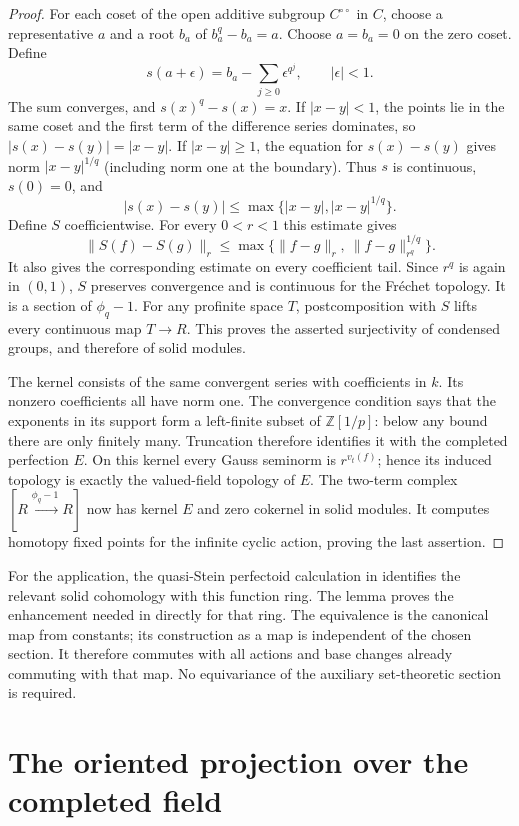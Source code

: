 \documentclass[11pt]{article}
\numberwithin{equation}{section}
\theoremstyle{definition}
\theoremstyle{remark}
\begin{document}
\begin{proof}
For each coset of the open additive subgroup $C^{\circ\circ}$ in $C$,
choose a representative $a$ and a root $b_a$ of $b_a^q-b_a=a$.
Choose $a=b_a=0$ on the zero coset.  Define
\[
 s(a+\epsilon)=b_a-\sum_{j\ge0}\epsilon^{q^j},
 \qquad |\epsilon|<1.
\]
The sum converges, and $s(x)^q-s(x)=x$.
If $|x-y|<1$, the points lie in the same coset and the first term
of the difference series dominates, so $|s(x)-s(y)|=|x-y|$.
If $|x-y|\ge1$, the equation for $s(x)-s(y)$ gives norm
$|x-y|^{1/q}$ (including norm one at the boundary).
Thus $s$ is continuous, $s(0)=0$, and
\[
 |s(x)-s(y)|\le\max\{|x-y|,|x-y|^{1/q}\}.
\]
Define $S$ coefficientwise.  For every $0<r<1$ this estimate gives
\[
 \|S(f)-S(g)\|_r
 \le\max\{\|f-g\|_r,\ \|f-g\|_{r^q}^{1/q}\}.
\]
It also gives the corresponding estimate on every coefficient tail.
Since $r^q$ is again in $(0,1)$, $S$ preserves convergence and is
continuous for the Fr\'echet topology.  It is a section of $\phi_q-1$.
For any profinite space $T$, postcomposition with $S$ lifts every
continuous map $T\to R$.  This proves the asserted surjectivity of
condensed groups, and therefore of solid modules.

The kernel consists of the same convergent series with coefficients in
$k$.  Its nonzero coefficients all have norm one.  The convergence
condition says that the exponents in its support form a left-finite
subset of $\mathbb Z[1/p]$: below any bound there are only finitely many.
Truncation therefore identifies it with the completed perfection $E$.
On this kernel every Gauss seminorm is $r^{v_t(f)}$; hence its induced
topology is exactly the valued-field topology of $E$.
The two-term complex $[R\xrightarrow{\phi_q-1}R]$ now has kernel
$E$ and zero cokernel in solid modules.  It computes homotopy fixed
points for the infinite cyclic action, proving the last assertion.
\end{proof}

For the application, the quasi-Stein perfectoid calculation in
\cite[Lemma~3.6.2]{BMR2026} identifies the relevant solid cohomology
with this function ring.  The lemma proves the enhancement needed in
\cite[Corollary~3.6.8]{BMR2026} directly for that ring.
The equivalence is the canonical map from constants; its construction
as a map is independent of the chosen section.  It therefore commutes
with all actions and base changes already commuting with that map.
No equivariance of the auxiliary set-theoretic section is required.

\section{The oriented projection over the completed field}
\label{app:oriented-projection}
\end{document}
